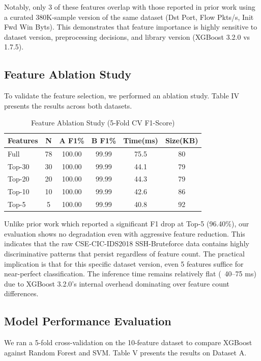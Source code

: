 \documentclass[conference]{IEEEtran}
\begin{document}
Notably, only 3 of these features overlap with those reported in prior work using a curated 380K-sample version of the same dataset (Dst Port, Flow Pkts/s, Init Fwd Win Byts). This demonstrates that feature importance is highly sensitive to dataset version, preprocessing decisions, and library version (XGBoost 3.2.0 vs 1.7.5).

\subsection{Feature Ablation Study}

To validate the feature selection, we performed an ablation study. Table IV presents the results across both datasets.

\begin{table}[!ht]
\centering
\caption{Feature Ablation Study (5-Fold CV F1-Score)}
\footnotesize
\setlength{\tabcolsep}{2pt}
\begin{tabulary}{\linewidth}{|l|c|c|c|c|c|}
\hline
\textbf{Features} & \textbf{N} & \textbf{A F1\%} & \textbf{B F1\%} & \textbf{Time(ms)} & \textbf{Size(KB)} \\
\hline
Full & 78 & 100.00 & 99.99 & 75.5 & 80 \\
Top-30 & 30 & 100.00 & 99.99 & 44.1 & 79 \\
Top-20 & 20 & 100.00 & 99.99 & 44.3 & 79 \\
Top-10 & 10 & 100.00 & 99.99 & 42.6 & 86 \\
Top-5 & 5 & 100.00 & 99.99 & 40.8 & 92 \\
\hline
\end{tabulary}
\end{table}

Unlike prior work which reported a significant F1 drop at Top-5 (96.40\%), our evaluation shows no degradation even with aggressive feature reduction. This indicates that the raw CSE-CIC-IDS2018 SSH-Bruteforce data contains highly discriminative patterns that persist regardless of feature count. The practical implication is that for this specific dataset version, even 5 features suffice for near-perfect classification. The inference time remains relatively flat (~40--75 ms) due to XGBoost 3.2.0's internal overhead dominating over feature count differences.

\subsection{Model Performance Evaluation}

We ran a 5-fold cross-validation on the 10-feature dataset to compare XGBoost against Random Forest and SVM. Table V presents the results on Dataset A.
\end{document}

